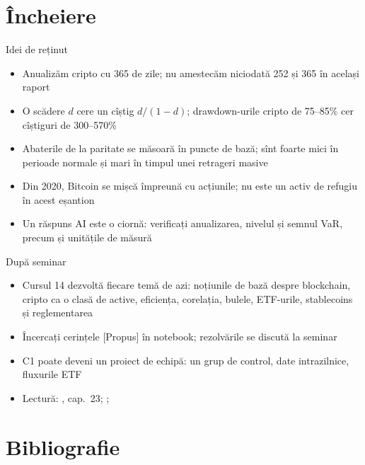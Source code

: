 \section{Încheiere}

\begin{frame}{Idei de reținut}
\itemsize{\small}
\begin{itemize}
    \item Anualizăm cripto cu 365 de zile; nu amestecăm niciodată 252 și 365 în același raport
    \item O scădere $d$ cere un cîștig $d/(1 - d)$; drawdown-urile cripto de 75--85\% cer cîștiguri de 300--570\%
    \item Abaterile de la paritate se măsoară în puncte de bază; sînt foarte mici în perioade normale și mari în timpul unei retrageri masive
    \item Din 2020, Bitcoin se mișcă împreună cu acțiunile; nu este un activ de refugiu în acest eșantion
    \item Un răspuns AI este o ciornă: verificați anualizarea, nivelul și semnul VaR, precum și unitățile de măsură
\end{itemize}
\end{frame}

\begin{frame}{După seminar}
\itemsize{\small}
\begin{itemize}
    \item Cursul 14 dezvoltă fiecare temă de azi: noțiunile de bază despre blockchain, cripto ca o clasă de active, eficiența, corelația, bulele, ETF-urile, stablecoins și reglementarea
    \item Încercați cerințele [Propus] în notebook; rezolvările se discută la seminar
    \item C1 poate deveni un proiect de echipă: un grup de control, date intrazilnice, fluxurile ETF
    \item Lectură: , cap.~23; ; 
\end{itemize}
\end{frame}


\section{Bibliografie}

